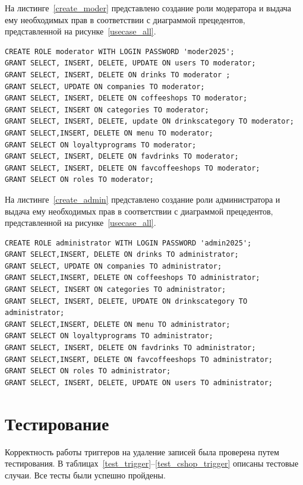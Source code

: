 На листинге~\ref{create_moder} представлено создание
роли модератора и выдача ему необходимых прав в соответствии с диаграммой прецедентов, представленной на рисунке~\ref{usecase_all}.

\newpage
\begin{center}
	\captionsetup{justification=raggedright,singlelinecheck=off}
	\begin{lstlisting}[label=create_moder,caption={Создание роли модератора}]
CREATE ROLE moderator WITH LOGIN PASSWORD 'moder2025';
GRANT SELECT, INSERT, DELETE, UPDATE ON users TO moderator;
GRANT SELECT, INSERT, DELETE ON drinks TO moderator ;
GRANT SELECT, UPDATE ON companies TO moderator;
GRANT SELECT, INSERT, DELETE ON coffeeshops TO moderator;
GRANT SELECT, INSERT ON categories TO moderator;
GRANT SELECT, INSERT, DELETE, update ON drinkscategory TO moderator;
GRANT SELECT,INSERT, DELETE ON menu TO moderator;
GRANT SELECT ON loyaltyprograms TO moderator;
GRANT SELECT, INSERT, DELETE ON favdrinks TO moderator;
GRANT SELECT, INSERT, DELETE ON favcoffeeshops TO moderator;
GRANT SELECT ON roles TO moderator;
	\end{lstlisting}
\end{center}

На листинге~\ref{create_admin} представлено создание
роли администратора и выдача ему необходимых прав в соответствии с диаграммой прецедентов, представленной на рисунке~\ref{usecase_all}.
\begin{center}
	\captionsetup{justification=raggedright,singlelinecheck=off}
	\begin{lstlisting}[label=create_admin,caption={Создание роли администратора}]
CREATE ROLE administrator WITH LOGIN PASSWORD 'admin2025';
GRANT SELECT,INSERT, DELETE ON drinks TO administrator;
GRANT SELECT, UPDATE ON companies TO administrator;
GRANT SELECT,INSERT, DELETE ON coffeeshops TO administrator;
GRANT SELECT, INSERT ON categories TO administrator;
GRANT SELECT, INSERT, DELETE, UPDATE ON drinkscategory TO administrator;
GRANT SELECT,INSERT, DELETE ON menu TO administrator;
GRANT SELECT ON loyaltyprograms TO administrator;
GRANT SELECT, INSERT, DELETE ON favdrinks TO administrator;
GRANT SELECT,INSERT, DELETE ON favcoffeeshops TO administrator;
GRANT SELECT ON roles TO administrator;
GRANT SELECT, INSERT, DELETE, UPDATE ON users TO administrator;
	\end{lstlisting}
\end{center}


\newpage
\section{Тестирование}
Корректность работы триггеров на удаление записей была проверена путем тестирования. В таблицах~\ref{test_trigger}--\ref{test_cshop_trigger} описаны тестовые случаи. Все тесты были успешно пройдены.


